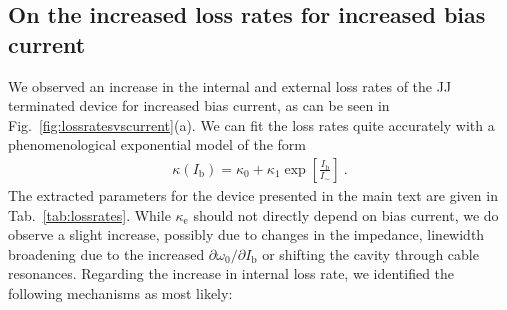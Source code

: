 \subsection{On the increased loss rates for increased bias current}\label{sec:lossrates}

% 
We observed an increase in the internal and external loss rates of the JJ terminated device for increased bias current, as can be seen in Fig.~\ref{fig:lossratesvscurrent}(a).
% 
We can fit the loss rates quite accurately with a phenomenological exponential model of the form
% 
\begin{align}
\kappa(I_\text{b}) = \kappa_0 + \kappa_1 \exp\left[\frac{I_\text{b}}{I_{\sim}}\right]\ .
\label{eq:lossrates}
\end{align}
% 
The extracted parameters for the device presented in the main text are given in Tab.~\ref{tab:lossrates}.
% 
While $\kappa_\text{e}$ should not directly depend on bias current, we do observe a slight increase, possibly due to changes in the impedance, linewidth broadening due to the increased $\partial\omega_0/\partial I_\text{b}$ or shifting the cavity through cable resonances.
% 
Regarding the increase in internal loss rate, we identified the following mechanisms as most likely:
% 
